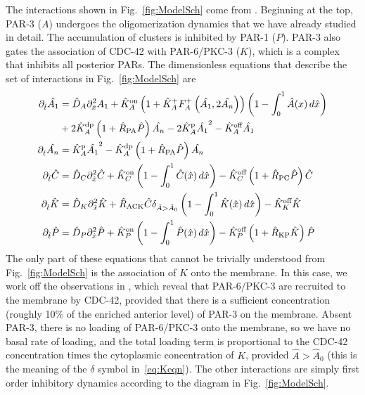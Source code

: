 \documentclass[11pt]{article}
\newcommand{\6}[1]{#1_{\text{6}}}
\newcommand{\3}[1]{#1_{\text{3}}}
\newcommand{\A}[1]{#1_A}
\begin{document}
The interactions shown in Fig.\ \ref{fig:ModelSch} come from \cite[Fig.~2]{lang2017proteins}. Beginning at the top, PAR-3 ($A$) undergoes the oligomerization dynamics that we have already studied in detail. The accumulation of clusters is inhibited by PAR-1 ($P$). PAR-3 also gates the association of CDC-42 with PAR-6/PKC-3 ($K$), which is a complex that inhibits all posterior PARs. The dimensionless equations that describe the set of interactions in Fig.\ \ref{fig:ModelSch} are
\begin{subequations}
\label{eq:AllBC}
\begin{align}
\nonumber
\Dthat \hat{\MA} & = \DhatA \Dxhat^2 \MA +\KhatonA \left(1+\KhatfA \A{F}^+\left(\hat{\MA},2\hat{\PA}\right)\right)\left(1 - \int_0^1 \hat{A}(x) \, d\hat{x} \right) \\ 
&+ 2\KhatdpA \left(1+\hat{R}_\text{PA}\hat{P}\right)\hat{\PA}-2\KhatpA \hat{\MA}^2 - \KhatoffA \hat{\MA} \\ 
\Dthat \hat{\PA} & =\KhatpA \hat{\MA}^2- \KhatdpA \left(1+\hat{R}_\text{PA}\hat{P}\right) \hat{\PA} \\ 
\label{eq:Ceqn}
\Dthat \hat{C}& =\DhatC \Dxhat^2 \hat{C} +\KhatonC \left(1 - \int_0^1 \hat{C}(\hat x) \, d\hat{x} \right)  - \KhatoffC \left(1+\hat{R}_\text{PC}\hat P\right)\hat{C}\\
\label{eq:Keqn}
\Dthat \hat{K}  &= \DhatK \Dxhat^2 \hat{K} + \hat{R}_\text{ACK} \hat{C} \delta_{\hat A > \hat A_0} \left(1 - \int_0^1 \hat{K}(\hat x) \, d\hat{x} \right)-\KhatoffK \hat{K} \\
\Dthat \hat{P} & =\DhatP \Dxhat^2 \hat{P} +\KhatonP \left(1 - \int_0^1 \hat{P}(\hat x) \, d\hat{x} \right)  - \KhatoffP \left(1+\hat{R}_\text{KP}\hat{K}\right)\hat{P}
\end{align}
\end{subequations}
The only part of these equations that cannot be trivially understood from Fig.\ \ref{fig:ModelSch} is the association of $K$ onto the membrane. In this case, we work off the observations in \cite{sailer2015dynamic}, which reveal that PAR-6/PKC-3 are recruited to the membrane by CDC-42, provided that there is a sufficient concentration (roughly 10\% of the enriched anterior level) of PAR-3 on the membrane. Absent PAR-3, there is no loading of PAR-6/PKC-3 onto the membrane, so we have no basal rate of loading, and the total loading term is proportional to the CDC-42 concentration times the cytoplasmic concentration of $K$, provided $\hat A > \hat A_0$ (this is the meaning of the $\delta$ symbol in\ \eqref{eq:Keqn}). The other interactions are simply first order inhibitory dynamics according to the diagram in Fig.\ \ref{fig:ModelSch}. 
\end{document}
